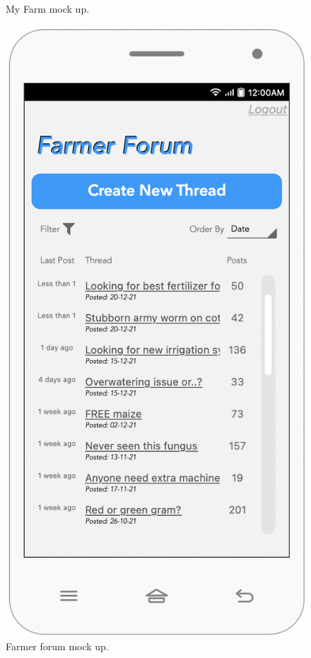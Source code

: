 \begin{multicols}{2}
\begin{figure}[H]
\caption{\label{fig:mock_farm}My Farm mock up.}
\end{figure}

\begin{figure}[H]
\centering
\includegraphics[scale=0.5]{../images_diagrams/mock_ups/farmerforum100.png}
\caption{\label{fig:mock_forum}Farmer forum mock up.}
\end{figure}
\end{multicols}
\newpage 
